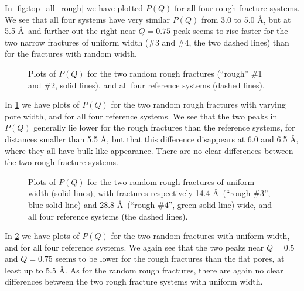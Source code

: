 In \cref{fig:top_all_rough} we have plotted $P(Q)$ for all four rough fracture systems. We see that all four systems have very similar $P(Q)$ from 3.0 to 5.0 \AA, but at 5.5 \AA\ and further out the right near $Q = 0.75$ peak seems to rise faster for the two narrow fractures of uniform width (\#3 and \#4, the two dashed lines) than for the fractures with random width.

%
\begin{figure}[!p]%
    \centering%
    \captionsetup{width=\textwidth}%
    \caption{%
        Plots of $P(Q)$ for the two random rough fractures (``rough'' \#1 and \#2, solid lines), and all four reference systems (dashed lines).%
        \label{fig:top_normal_and_reference}%
    }%
\end{figure}%

In \cref{fig:top_normal_and_reference} we have plots of $P(Q)$ for the two random rough fractures with varying pore width, and for all four reference systems. We see that the two peaks in $P(Q)$ generally lie lower for the rough fractures than the reference systems, for distances smaller than 5.5 \AA, but that this difference disappears at 6.0 and 6.5 \AA, where they all have bulk-like appearance. There are no clear differences between the two rough fracture systems.

%
\begin{figure}[!p]%
    \centering%
    \captionsetup{width=\textwidth}%
    \caption{%
        Plots of $P(Q)$ for the two random rough fractures of uniform width (solid lines), with fractures respectively 14.4 \AA\ (``rough \#3'', blue solid line) and 28.8 \AA\ (``rough \#4'', green solid line) wide, and all four reference systems (the dashed lines).%
        \label{fig:top_narrow_and_reference}%
    }%
\end{figure}%

In \cref{fig:top_narrow_and_reference} we have plots of $P(Q)$ for the two random fractures with uniform width, and for all four reference systems. We again see that the two peaks near $Q = 0.5$ and $Q = 0.75$ seems to be lower for the rough fractures than the flat pores, at least up to 5.5 \AA. As for the random rough fractures, there are again no clear differences between the two rough fracture systems with uniform width.


